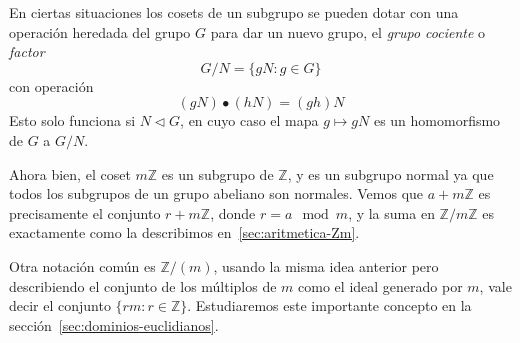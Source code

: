   En ciertas situaciones los cosets de un subgrupo
  se pueden dotar con una operación
  heredada del grupo \(G\) para dar un nuevo grupo,
  el \emph{grupo cociente} o \emph{factor}
  \begin{equation*}
    G / N
      = \{g N \colon g \in G\}
  \end{equation*}
  con operación
  \begin{equation*}
    (g N) \bullet (h N)
      = (g h) N
  \end{equation*}
  Esto solo funciona si \(N \lhd G\),
  en cuyo caso el mapa \(g \mapsto g N\)
  es un homomorfismo de \(G\) a \(G / N\).%

  Ahora bien,
  el coset \(m \mathbb{Z}\) es un subgrupo de \(\mathbb{Z}\),
  y es un subgrupo normal
  ya que todos los subgrupos de un grupo abeliano son normales.
  Vemos que \(a + m \mathbb{Z}\) es precisamente el conjunto
  \(r + m \mathbb{Z}\), donde \(r = a \mod m\),
  y la suma en \(\mathbb{Z} / m \mathbb{Z}\)
  es exactamente como la describimos en~\ref{sec:aritmetica-Zm}.

  Otra notación común es \(\mathbb{Z} / (m)\),
  usando la misma idea anterior
  pero describiendo el conjunto de los múltiplos de \(m\)
  como el ideal generado por \(m\),
  vale decir el conjunto \(\{ r m \colon r \in \mathbb{Z}\}\).
  Estudiaremos este importante concepto
  en la sección~\ref{sec:dominios-euclidianos}.

